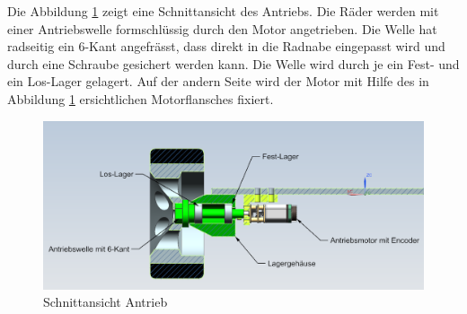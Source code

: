 Die Abbildung \ref{fig:sectionview-wheelmount} zeigt eine Schnittansicht des Antriebs. Die Räder werden mit einer Antriebswelle formschlüssig durch den Motor angetrieben. Die Welle hat radseitig ein 6-Kant angefrässt, dass direkt in die Radnabe eingepasst wird und durch eine Schraube gesichert werden kann. Die Welle wird durch je ein Fest- und ein Los-Lager gelagert. Auf der andern Seite wird der Motor mit Hilfe des in Abbildung \ref{fig:sectionview-wheelmount} ersichtlichen Motorflansches fixiert. 

\begin{figure}[H]
\centering
\includegraphics[width=1.0\textwidth]{img/Antrieb.png}
\caption{Schnittansicht Antrieb}
\label{fig:sectionview-wheelmount}
\end{figure}



